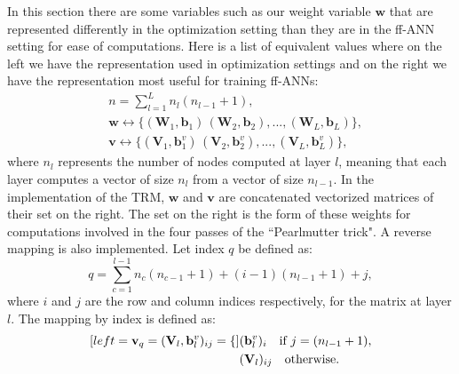 \documentclass[letterpaper,12pt,titlepage,oneside,final]{book}
\begin{document}
	In this section there are some variables such as our weight variable $\mathbf{w}$ that are represented differently in the optimization setting than they are in the ff-ANN setting for ease of computations. Here is a list of equivalent values where on the left we have the representation used in optimization settings and on the right we have the representation most useful for training ff-ANNs:
	\begin{equation}
	\begin{split}
	&  n = \sum_{l=1}^{L}{n_{l}(n_{l-1}+1)} ,
	\\&    \mathbf{w} \leftrightarrow \{(\mathbf{W}_{1},\mathbf{b}_{1})\, (\mathbf{W}_{2},\mathbf{b}_{2}), ... , (\mathbf{W}_{L},\mathbf{b}_{L})\} ,
	\\&    \mathbf{v} \leftrightarrow \{(\mathbf{V}_{1},\mathbf{b}_{1}^{v})\, (\mathbf{V}_{2},\mathbf{b}_{2}^{v}), ... , (\mathbf{V}_{L},\mathbf{b}_{L}^{v})\} ,
	\label{equation:map}
	\end{split}    
	\end{equation}
	where $n_{l}$ represents the number of nodes computed at layer $l$, meaning that each layer computes a vector of size $n_{l}$ from a vector of size $n_{l-1}$. In the implementation of the TRM, $\mathbf{w}$ and $\mathbf{v}$ are concatenated vectorized matrices of their set on the right. The set on the right is the form of these weights for computations involved in the four passes of the ``Pearlmutter trick". A reverse mapping is also implemented. Let index $q$ be defined as:
	\begin{equation}
	q = \sum_{c=1}^{l-1}{n_{c}(n_{c-1}+1)} + (i-1)(n_{l-1}+1) + j,
	\label{equation:index}
	\end{equation}
	where $i$ and $j$ are the row and column indices respectively, for the matrix at layer $l$. The mapping by index is defined as:
	\begin{subequations}
		\begin{align}[left = {\mathbf{v}_{q} =(\mathbf{V}_{l},\mathbf{b}_{l}^{v})_{ij} = \empheqlbrace\,}]
		& (\mathbf{b}^{v}_{l})_{i}  \quad \text{if} \ j = (n_{l-1} + 1), \\
		& (\mathbf{V}_{l})_{ij} \quad  \text{otherwise}.
		\end{align}
		\label{equation:biasindex}
	\end{subequations}
	
\end{document}
